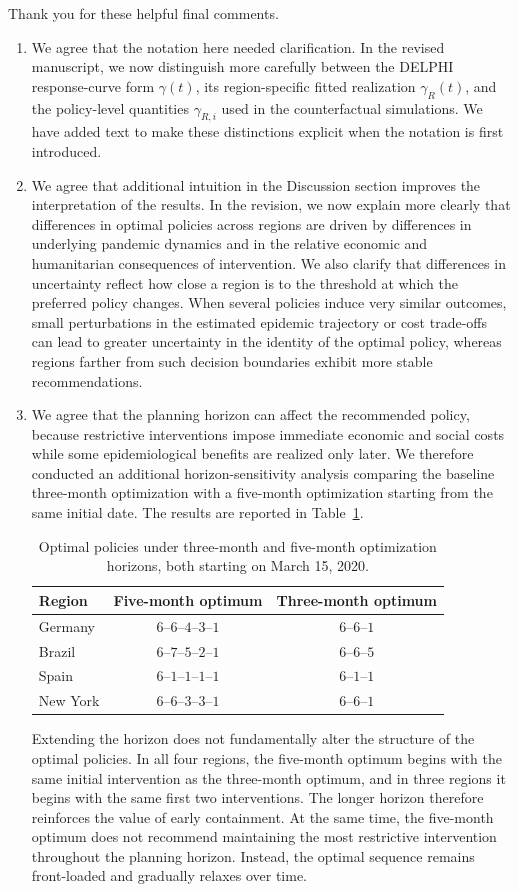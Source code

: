 \documentclass[letterpaper,twoside,11pt]{reviewresponse}
\begin{document}
Thank you for these helpful final comments.
\begin{enumerate}
\item We agree that the notation here needed clarification. In the revised manuscript, we now distinguish more carefully between the DELPHI response-curve form $\gamma(t)$, its region-specific fitted realization $\gamma_R(t)$, and the policy-level quantities $\gamma_{R,i}$ used in the counterfactual simulations. We have added text to make these distinctions explicit when the notation is first introduced.
\item We agree that additional intuition in the Discussion section improves the interpretation of the results. In the revision, we now explain more clearly that differences in optimal policies across regions are driven by differences in underlying pandemic dynamics and in the relative economic and humanitarian consequences of intervention. We also clarify that differences in uncertainty reflect how close a region is to the threshold at which the preferred policy changes. When several policies induce very similar outcomes, small perturbations in the estimated epidemic trajectory or cost trade-offs can lead to greater uncertainty in the identity of the optimal policy, whereas regions farther from such decision boundaries exhibit more stable recommendations.
\item We agree that the planning horizon can affect the recommended policy, because restrictive interventions impose immediate economic and social costs while some epidemiological benefits are realized only later. We therefore conducted an additional horizon-sensitivity analysis comparing the baseline three-month optimization with a five-month optimization starting from the same initial date. The results are reported in Table~\ref{tab:horizon_comparison}.
\begin{table}[htbp!]
	\centering
		\begin{tabular}{|l|c|c|}
			\hline
			Region & Five-month optimum & Three-month optimum \\\hline
			Germany & $6$--$6$--$4$--$3$--$1$ & $6$--$6$--$1$\\
			Brazil & $6$--$7$--$5$--$2$--$1$ & $6$--$6$--$5$\\
			Spain & $6$--$1$--$1$--$1$--$1$ & $6$--$1$--$1$\\
			New York & $6$--$6$--$3$--$3$--$1$ & $6$--$6$--$1$\\\hline
		\end{tabular}
	\caption{Optimal policies under three-month and five-month optimization horizons, both starting on March 15, 2020.}
	\label{tab:horizon_comparison}
\end{table}
Extending the horizon does not fundamentally alter the structure of the optimal policies. In all four regions, the five-month optimum begins with the same initial intervention as the three-month optimum, and in three regions it begins with the same first two interventions. The longer horizon therefore reinforces the value of early containment. At the same time, the five-month optimum does not recommend maintaining the most restrictive intervention throughout the planning horizon. Instead, the optimal sequence remains front-loaded and gradually relaxes over time.


\end{enumerate}
\end{document}
